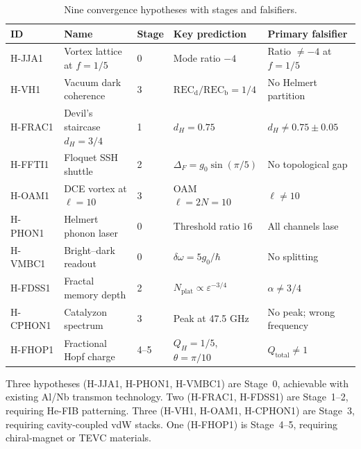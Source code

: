 \documentclass[11pt,letterpaper]{article}
\newcommand{\gzero}{g_0}
\newcommand{\Qhopf}{Q_H}
\begin{document}
\begin{table}[H]
\centering
\caption{Nine convergence hypotheses with stages and falsifiers.}\label{tab:hypotheses}
\small
\begin{tabular}{@{}llllp{4.2cm}@{}}
\toprule
\textbf{ID} & \textbf{Name} & \textbf{Stage} & \textbf{Key prediction} & \textbf{Primary falsifier} \\
\midrule
H-JJA1  & Vortex lattice at $f{=}1/5$   & 0 & Mode ratio $-4$     & Ratio $\neq -4$ at $f{=}1/5$ \\
H-VH1   & Vacuum dark coherence          & 3 & $\mathrm{REC}_{\mathrm{d}}/\mathrm{REC}_{\mathrm{b}} = 1/4$  & No Helmert partition \\
H-FRAC1 & Devil's staircase $d_H{=}3/4$  & 1 & $d_H = 0.75$        & $d_H \neq 0.75 \pm 0.05$ \\
H-FFTI1 & Floquet SSH shuttle            & 2 & $\Delta_F = \gzero\sin(\pi/5)$  & No topological gap \\
H-OAM1  & DCE vortex at $\ell{=}10$      & 3 & OAM $\ell = 2N = 10$  & $\ell \neq 10$ \\
H-PHON1 & Helmert phonon laser           & 0 & Threshold ratio $16$  & All channels lase \\
H-VMBC1 & Bright--dark readout           & 0 & $\delta\omega = 5\gzero/\hbar$  & No splitting \\
H-FDSS1 & Fractal memory depth           & 2 & $N_{\mathrm{plat}} \propto \varepsilon^{-3/4}$  & $\alpha \neq 3/4$ \\
H-CPHON1 & Catalyzon spectrum            & 3 & Peak at 47.5 GHz    & No peak; wrong frequency \\
H-FHOP1 & Fractional Hopf charge         & 4--5 & $\Qhopf = 1/5$, $\theta = \pi/10$  & $Q_{\mathrm{total}} \neq 1$ \\
\bottomrule
\end{tabular}
\end{table}

Three hypotheses (H-JJA1, H-PHON1, H-VMBC1) are Stage~0, achievable with existing Al/Nb transmon technology.  Two (H-FRAC1, H-FDSS1) are Stage~1--2, requiring He-FIB patterning.  Three (H-VH1, H-OAM1, H-CPHON1) are Stage~3, requiring cavity-coupled vdW stacks.  One (H-FHOP1) is Stage~4--5, requiring chiral-magnet or TEVC materials.
\end{document}
